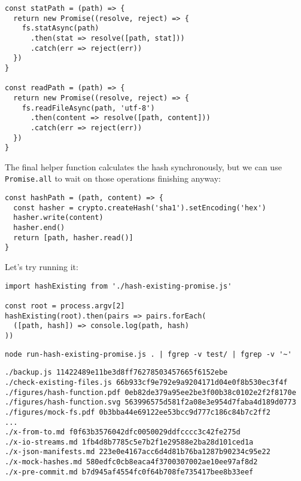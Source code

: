 \documentclass[krantzl]{krantz}
\begin{document}
\begin{lstlisting}[frame=tblr]
const statPath = (path) => {
  return new Promise((resolve, reject) => {
    fs.statAsync(path)
      .then(stat => resolve([path, stat]))
      .catch(err => reject(err))
  })
}

const readPath = (path) => {
  return new Promise((resolve, reject) => {
    fs.readFileAsync(path, 'utf-8')
      .then(content => resolve([path, content]))
      .catch(err => reject(err))
  })
}
\end{lstlisting}



The final helper function calculates the hash synchronously,
but we can use \texttt{Promise.all} to wait on those operations finishing anyway:


\begin{lstlisting}[frame=tblr]
const hashPath = (path, content) => {
  const hasher = crypto.createHash('sha1').setEncoding('hex')
  hasher.write(content)
  hasher.end()
  return [path, hasher.read()]
}
\end{lstlisting}



Let’s try running it:


\begin{lstlisting}[frame=tblr]
import hashExisting from './hash-existing-promise.js'

const root = process.argv[2]
hashExisting(root).then(pairs => pairs.forEach(
  ([path, hash]) => console.log(path, hash)
))
\end{lstlisting}



\begin{lstlisting}[frame=shadowbox]
node run-hash-existing-promise.js . | fgrep -v test/ | fgrep -v '~'
\end{lstlisting}



\begin{lstlisting}[frame=tblr,backgroundcolor=\color{black!5}]
./backup.js 11422489e11be3d8ff76278503457665f6152ebe
./check-existing-files.js 66b933cf9e792e9a9204171d04e0f8b530ec3f4f
./figures/hash-function.pdf 0eb82de379a95ee2be3f00b38c0102e2f2f8170e
./figures/hash-function.svg 563996575d581f2a08e3e954d7faba4d189d0773
./figures/mock-fs.pdf 0b3bba44e69122ee53bcc9d777c186c84b7c2ff2
...
./x-from-to.md f0f63b3576042dfc0050029ddfcccc3c42fe275d
./x-io-streams.md 1fb4d8b7785c5e7b2f1e29588e2ba28d101ced1a
./x-json-manifests.md 223e0e4167acc6d4d81b76ba1287b90234c95e22
./x-mock-hashes.md 580edfc0cb8eaca4f3700307002ae10ee97af8d2
./x-pre-commit.md b7d945af4554fc0f64b708fe735417bee8b33eef
\end{lstlisting}
\end{document}
